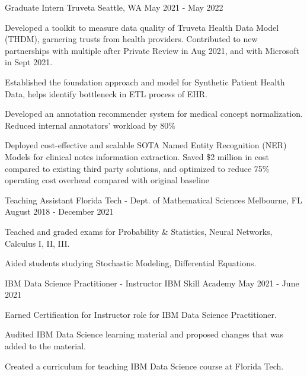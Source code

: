 \begin{cventries}

	\cventry
	{Graduate Intern}
	{Truveta}
	{Seattle, WA}
	{May 2021 - May 2022}
	{\begin{cvitems}
			\item {Developed a toolkit to measure data quality of Truveta Health Data Model (THDM), garnering trusts from health providers. Contributed to new partnerships with multiple after Private Review in Aug 2021, and with Microsoft in Sept 2021.}
			\item {Established the foundation approach and model for Synthetic Patient Health Data, helps identify bottleneck in ETL process of EHR.}
			\item {Developed an annotation recommender system for medical concept normalization. Reduced internal annotators' workload by 80\%}
			\item {Deployed cost-effective and scalable SOTA Named Entity Recognition (NER) Models for clinical notes information extraction. Saved \$2 million in cost compared to existing third party solutions, and optimized to reduce 75\% operating cost overhead compared with original baseline}
		\end{cvitems}}
	\cventry
	{Teaching Assistant}
	{Florida Tech - Dept. of Mathematical Sciences}
	{Melbourne, FL}
	{August 2018 - December 2021}
	{\begin{cvitems}
			\item {Teached and graded exams for Probability \& Statistics, Neural Networks, Calculus I, II, III.}
			\item {Aided students studying Stochastic Modeling, Differential Equations.}
		\end{cvitems}}
	\cventry
	{IBM Data Science Practitioner - Instructor}
	{IBM Skill Academy}
	{}
	{May 2021 - June 2021}
	{\begin{cvitems}
			\item {Earned Certification for Instructor role for IBM Data Science Practitioner.}
			\item {Audited IBM Data Science learning material and proposed changes that was added to the material.}
			\item {Created a curriculum for teaching IBM Data Science course at Florida Tech.}
		\end{cvitems}}
\end{cventries}
\vspace{-4mm}